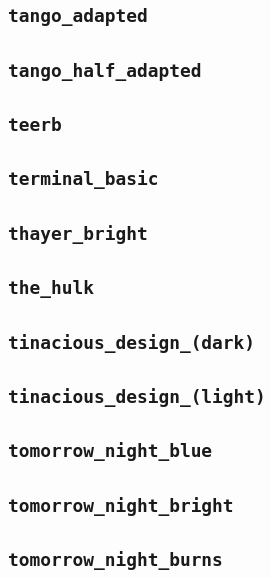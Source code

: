 \subsection{\texttt{tango\_adapted}}
\newpage
\subsection{\texttt{tango\_half\_adapted}}
\newpage
\subsection{\texttt{teerb}}
\newpage
\subsection{\texttt{terminal\_basic}}
\newpage
\subsection{\texttt{thayer\_bright}}
\newpage
\subsection{\texttt{the\_hulk}}
\newpage
\subsection{\texttt{tinacious\_design\_(dark)}}
\newpage
\subsection{\texttt{tinacious\_design\_(light)}}
\newpage
\subsection{\texttt{tomorrow\_night\_blue}}
\newpage
\subsection{\texttt{tomorrow\_night\_bright}}
\newpage
\subsection{\texttt{tomorrow\_night\_burns}}
\newpage
